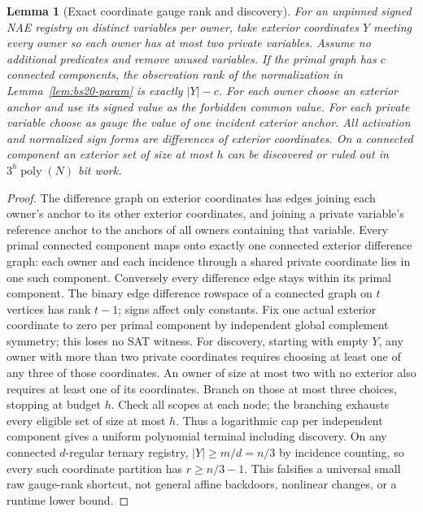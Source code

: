 \documentclass[11pt]{article}
\newtheorem{lemma}[theorem]{Lemma}
\begin{document}
\begin{lemma}[Exact coordinate gauge rank and discovery]\label{lem:bs20-gauge}
For an unpinned signed NAE registry on distinct variables per owner, take exterior coordinates $Y$ meeting every owner so each owner has at most two private variables. Assume no additional predicates and remove unused variables. If the primal graph has $c$ connected components, the observation rank of the normalization in Lemma~\ref{lem:bs20-param} is exactly $|Y|-c$. For each owner choose an exterior anchor and use its signed value as the forbidden common value. For each private variable choose as gauge the value of one incident exterior anchor. All activation and normalized sign forms are differences of exterior coordinates. On a connected component an exterior set of size at most $h$ can be discovered or ruled out in $3^h\operatorname{poly}(N)$ bit work.
\end{lemma}
\begin{proof}
The difference graph on exterior coordinates has edges joining each owner's anchor to its other exterior coordinates, and joining a private variable's reference anchor to the anchors of all owners containing that variable. Every primal connected component maps onto exactly one connected exterior difference graph: each owner and each incidence through a shared private coordinate lies in one such component. Conversely every difference edge stays within its primal component. The binary edge difference rowspace of a connected graph on $t$ vertices has rank $t-1$; signs affect only constants. Fix one actual exterior coordinate to zero per primal component by independent global complement symmetry; this loses no SAT witness. For discovery, starting with empty $Y$, any owner with more than two private coordinates requires choosing at least one of any three of those coordinates. An owner of size at most two with no exterior also requires at least one of its coordinates. Branch on those at most three choices, stopping at budget $h$. Check all scopes at each node; the branching exhausts every eligible set of size at most $h$. Thus a logarithmic cap per independent component gives a uniform polynomial terminal including discovery. On any connected $d$-regular ternary registry, $|Y|\ge m/d=n/3$ by incidence counting, so every such coordinate partition has $r\ge n/3-1$. This falsifies a universal small raw gauge-rank shortcut, not general affine backdoors, nonlinear changes, or a runtime lower bound.
\end{proof}
\end{document}
